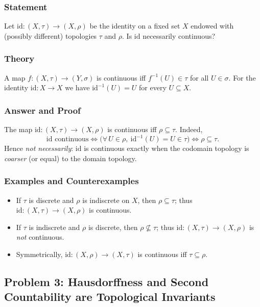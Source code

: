\documentclass[12pt,a4paper]{article}
\theoremstyle{plain}
\theoremstyle{definition}
\theoremstyle{remark}
\theoremstyle{remark}
\begin{document}
\subsubsection*{Statement}
Let $\mathrm{id}:(X,\tau)\to (X,\rho)$ be the identity on a fixed set $X$ endowed with (possibly different) topologies $\tau$ and $\rho$. Is $\mathrm{id}$ necessarily continuous?

\subsubsection*{Theory}
A map $f:(X,\tau)\to(Y,\sigma)$ is continuous iff $f^{-1}(U)\in\tau$ for all $U\in\sigma$.
For the identity $\mathrm{id}:X\to X$ we have $\mathrm{id}^{-1}(U)=U$ for every $U\subseteq X$.

\subsubsection*{Answer and Proof}
The map $\mathrm{id}:(X,\tau)\to(X,\rho)$ is continuous iff $\rho\subseteq\tau$.
Indeed,
\[
\mathrm{id}\text{ continuous}\iff
\Big(\forall\,U\in\rho,\ \mathrm{id}^{-1}(U)=U\in\tau\Big)
\iff \rho\subseteq\tau.
\]
Hence \emph{not necessarily}: $\mathrm{id}$ is continuous exactly when the codomain topology is \emph{coarser} (or equal) to the domain topology.

\subsubsection*{Examples and Counterexamples}
\begin{itemize}
	\item If $\tau$ is discrete and $\rho$ is indiscrete on $X$, then $\rho\subseteq\tau$; thus $\mathrm{id}:(X,\tau)\to(X,\rho)$ is continuous.
	\item If $\tau$ is indiscrete and $\rho$ is discrete, then $\rho\nsubseteq\tau$; thus $\mathrm{id}:(X,\tau)\to(X,\rho)$ is \emph{not} continuous.
	\item Symmetrically, $\mathrm{id}:(X,\rho)\to(X,\tau)$ is continuous iff $\tau\subseteq\rho$.
\end{itemize}

\bigskip

\subsection*{Problem 3: Hausdorffness and Second Countability are Topological Invariants}
\end{document}
